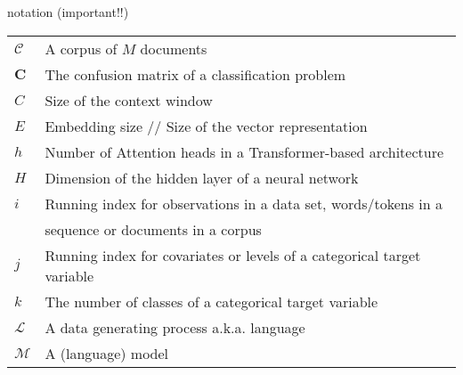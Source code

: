 \begin{vbframe}{notation (important!!)}

\vfill

\begin{tabular}{ll}
        $\mathcal{C}$ & A corpus of $M$ documents\\[.5em]
        $\mathbf{C}$ & The confusion matrix of a classification problem\\[.5em]
        $C$ & Size of the context window\\[.5em]
        $E$ & Embedding size // Size of the vector representation\\[.5em]
        $h$ & Number of Attention heads in a Transformer-based architecture\\[.5em]
        $H$ & Dimension of the hidden layer of a neural network\\[.5em]
        $i$ & Running index for observations in a data set, words/tokens in a\\
            & sequence or documents in a corpus\\[.5em]
        $j$ & Running index for covariates or levels of a categorical target variable\\[.5em]
        $k$ & The number of classes of a categorical target variable\\[.5em]
        $\mathcal{L}$ & A data generating process a.k.a. language\\[.5em]
        $\mathcal{M}$ & A (language) model\\[.5em]
\end{tabular}

\vfill

\end{vbframe}


